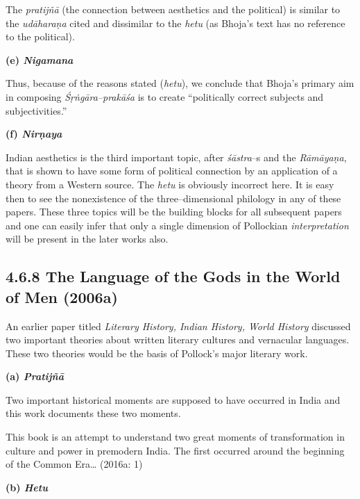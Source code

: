 The \textit{pratijñā} (the connection between aesthetics and the political) is similar to the \textit{udāharaṇa} cited and dissimilar to the \textit{hetu} (as Bhoja’s text has no reference to the political).

\textbf{(e) \textit{Nigamana}}

Thus, because of the reasons stated (\textit{hetu}), we conclude that Bhoja’s primary aim in composing \textit{Śṛṅgāra–prakāśa} is to create “politically correct subjects and subjectivities.”

\textbf{(f) \textit{Nirṇaya}}

Indian aesthetics is the third important topic, after \textit{śāstra}–s and the \textit{Rāmāyaṇa}, that is shown to have some form of political connection by an application of a theory from a Western source. The \textit{hetu} is obviously incorrect here. It is easy then to see the nonexistence of the three–dimensional philology in any of these papers. These three topics will be the building blocks for all subsequent papers and one can easily infer that only a single dimension of Pollockian \textit{interpretation} will be present in the later works also.

\vspace{-.5cm}

\subsection*{4.6.8 The Language of the Gods in the World of Men (2006a)}

\vspace{-.3cm}

An earlier paper titled \textit{Literary History, Indian History, World History }discussed two important theories about written literary cultures and vernacular languages. These two theories would be the basis of Pollock’s major literary work.

\textbf{(a) \textit{Pratijñā }}

Two important historical moments are supposed to have occurred in India and this work documents these two moments.

\begin{myquote}
This book is an attempt to understand two great moments of transformation in culture and power in premodern India. The ﬁrst occurred around the beginning of the Common Era… (2016a: 1)
\end{myquote}

\textbf{(b) \textit{Hetu}}

